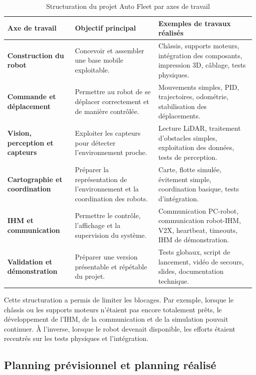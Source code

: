 \documentclass[11pt,a4paper]{report}
\begin{document}
\begin{table}[H]
\centering
\small
\renewcommand{\arraystretch}{1.25}
\begin{tabular}{|p{4.1cm}|p{6.2cm}|p{4.4cm}|}
\hline
\textbf{Axe de travail} & \textbf{Objectif principal} & \textbf{Exemples de travaux réalisés} \\
\hline
\textbf{Construction du robot} &
Concevoir et assembler une base mobile exploitable. &
Châssis, supports moteurs, intégration des composants, impression 3D, câblage, tests physiques. \\
\hline
\textbf{Commande et déplacement} &
Permettre au robot de se déplacer correctement et de manière contrôlée. &
Mouvements simples, PID, trajectoires, odométrie, stabilisation des déplacements. \\
\hline
\textbf{Vision, perception et capteurs} &
Exploiter les capteurs pour détecter l'environnement proche. &
Lecture LiDAR, traitement d'obstacles simples, exploitation des données, tests de perception. \\
\hline
\textbf{Cartographie et coordination} &
Préparer la représentation de l'environnement et la coordination des robots. &
Carte, flotte simulée, évitement simple, coordination basique, tests d'intégration. \\
\hline
\textbf{IHM et communication} &
Permettre le contrôle, l'affichage et la supervision du système. &
Communication PC-robot, communication robot-IHM, V2X, heartbeat, timeouts, IHM de démonstration. \\
\hline
\textbf{Validation et démonstration} &
Préparer une version présentable et répétable du projet. &
Tests globaux, script de lancement, vidéo de secours, slides, documentation technique. \\
\hline
\end{tabular}
\caption{Structuration du projet Auto Fleet par axes de travail}
\label{tab:axes_travail}
\end{table}

Cette structuration a permis de limiter les blocages. Par exemple, lorsque le châssis ou les supports moteurs n'étaient pas encore totalement prêts, le développement de l'IHM, de la communication et de la simulation pouvait continuer. À l'inverse, lorsque le robot devenait disponible, les efforts étaient recentrés sur les tests physiques et l'intégration.

\subsection{Planning prévisionnel et planning réalisé}
\end{document}
